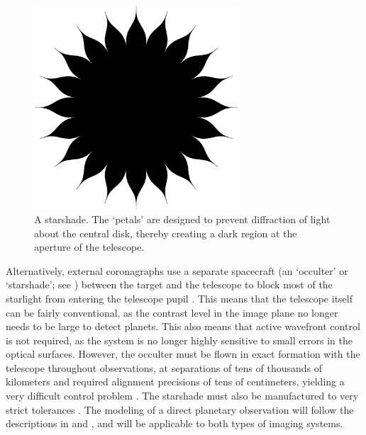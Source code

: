 \begin{figure}[ht]
 \center
 \includegraphics[width=3in]{./figures/theiaOcculter}
  \caption[Starshade]{ \label{fig:theiaOcculter} A starshade.  The `petals' are designed to prevent diffraction of light about the central disk, thereby creating a dark region at the aperture of the telescope.}
 \end{figure}
Alternatively, external coronagraphs use a separate spacecraft (an `occulter' or `starshade'; see ) between the target and the telescope to block most of the starlight from entering the telescope pupil \citep{cash2006detection,vanderbei2007,cady2010design}.  This means that the telescope itself can be fairly conventional, as the contrast level in the image plane no longer needs to be large to detect planets.  This also means that 
active wavefront control is not required, as the system is no longer highly sensitive to small errors in the optical surfaces.  However, the occulter must be flown in exact formation with the telescope throughout observations, at separations of tens of thousands of kilometers and required alignment precisions of tens of centimeters, yielding a very difficult control problem \citep{sirbu2010dynamical}.  The starshade must also be manufactured to very strict tolerances \citep{shaklan2010error}.  The modeling of a direct planetary observation will follow the descriptions in  \citet{brown2005} and \citet{savransky2010}, and will be applicable to both types of imaging systems.  

